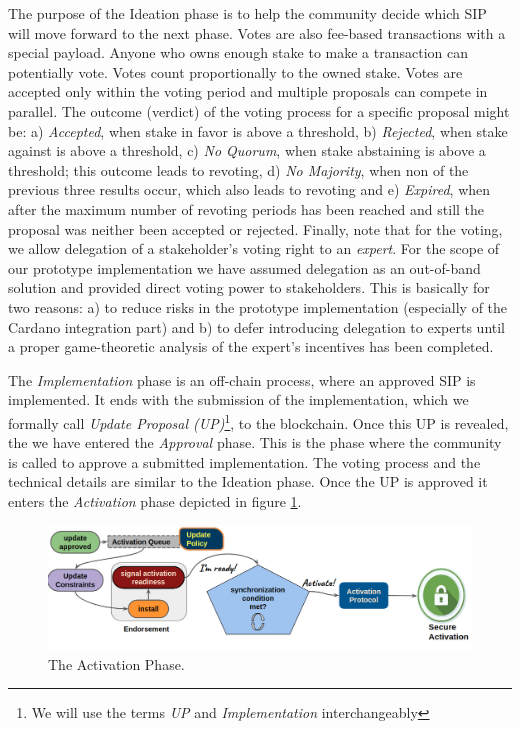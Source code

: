 {The purpose of the Ideation phase is to help the community decide which SIP
will move forward to the next phase. Votes are also fee-based transactions with
a special payload. Anyone who owns enough stake to make a transaction can
potentially vote. Votes count proportionally to the owned stake. Votes are
accepted only within the voting period and multiple proposals can compete in
parallel. The outcome (verdict) of the voting process for a specific proposal
might be: a) \emph{Accepted}, when stake in favor is above a threshold, b)
\emph{Rejected}, when stake against is above a threshold, c) \emph{No Quorum},
when stake abstaining is above a threshold; this outcome leads to revoting, d)
\emph{No Majority}, when non of the previous three results occur, which also
leads to revoting and e) \emph{Expired}, when after the maximum number of
revoting periods has been reached and still the proposal was neither been
accepted or rejected. Finally, note that for the voting, we allow delegation of
a stakeholder's voting right to an \emph{expert}. For the scope of our
prototype implementation we have assumed delegation as an out-of-band solution
and provided direct voting power to stakeholders. This is basically for two
reasons: a) to reduce risks in the prototype implementation (especially of the
Cardano integration part) and b) to defer introducing delegation to experts
until a proper game-theoretic analysis of the expert's incentives has been
completed.

The \emph{Implementation} phase is an off-chain process, where an approved SIP
is implemented. It ends with the submission of the implementation, which we
formally call \emph{Update Proposal (UP)}\footnote{We will use the terms
	\emph{UP} and \emph{Implementation} interchangeably}, to the blockchain.
Once
this UP is
revealed, the we have entered the \emph{Approval} phase. This is the phase
where the community is called to approve a submitted implementation. The voting
process and the technical details are similar to the Ideation
phase. Once the
UP is approved it enters the \emph{Activation} phase depicted in figure
\ref{fig:activation_phase}.

\begin{figure}[h!] %
	\centering
	\includegraphics[width=0.8\columnwidth,
	keepaspectratio]{figures/activation_phase.png}
	\caption{The Activation Phase.}
	\label{fig:activation_phase}
\end{figure}

}
